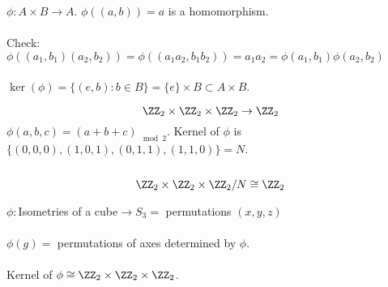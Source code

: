 \documentclass[class=scrartcl, crop=false]{standalone}
\begin{document}
\begin{example}
  $\phi:A \times B \to A$. $\phi((a, b)) = a$ is a homomorphism.
  \\\\
  Check: $\phi((a_1,b_1)(a_2,b_2)) = \phi((a_1a_2,b_1b_2)) = a_1a_2 = \phi(a_1,b_1)\phi(a_2,b_2)$
  \\\\
  $\ker(\phi) = \{(e, b): b \in B\} = \{e\}\times B \subset A \times B$.
\end{example}
\begin{example}
  \[
    \ZZ_2 \times \ZZ_2 \times \ZZ_2 \to \ZZ_2
  \]
  $\phi(a,b,c) = (a + b + c)_{\mod 2}$. Kernel of $\phi$ is $\{(0, 0, 0), (1, 0, 1), (0, 1, 1), (1, 1, 0)\} = N$.
  \\\\
  \[\ZZ_2 \times \ZZ_2 \times \ZZ_2 / N \cong \ZZ_2\]
\end{example}

\begin{example}
  $\phi:$Isometries of a cube$\to S_3 = $ permutations $(x, y, z)$
  \\\\
  $\phi(g) = $ permutations of axes determined by $\phi$.
  \\\\
  Kernel of $\phi \cong \ZZ_2 \times \ZZ_2 \times \ZZ_2$.
\end{example}
\end{document}
